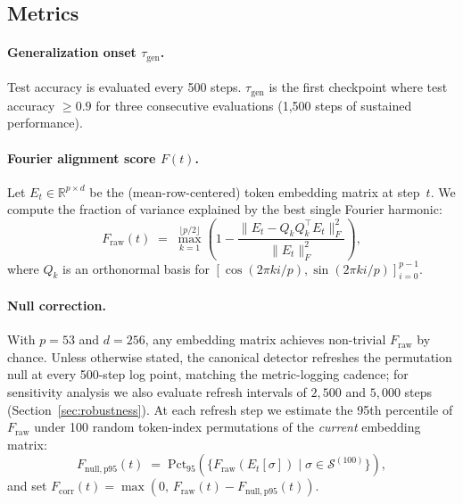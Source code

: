 \documentclass{article}
\newcommand{\taug}{\tau_{\mathrm{gen}}}
\newcommand{\fcorr}{F_{\mathrm{corr}}}
\begin{document}
\subsection{Metrics}

\paragraph{Generalization onset $\taug$.}
Test accuracy is evaluated every 500 steps.
$\taug$ is the first checkpoint where test accuracy $\geq 0.9$ for
three consecutive evaluations (1{,}500 steps of sustained
performance).

\paragraph{Fourier alignment score $F(t)$.}
Let $E_t \in \mathbb{R}^{p \times d}$ be the (mean-row-centered) token
embedding matrix at step~$t$.
We compute the fraction of variance explained by the best single
Fourier harmonic:
\begin{equation}
  F_{\mathrm{raw}}(t) \;=\; \max_{k=1}^{\lfloor p/2\rfloor}
  \!\left(1 - \frac{\|E_t - Q_k Q_k^\top E_t\|_F^2}
  {\|E_t\|_F^2}\right),
  \label{eq:f_raw}
\end{equation}
where $Q_k$ is an orthonormal basis for
$[\cos(2\pi ki/p),\sin(2\pi ki/p)]_{i=0}^{p-1}$.

\paragraph{Null correction.}
With $p=53$ and $d=256$, any embedding matrix achieves non-trivial
$F_{\mathrm{raw}}$ by chance.
Unless otherwise stated, the canonical detector refreshes the
permutation null at every 500-step log point, matching the
metric-logging cadence; for sensitivity analysis we also evaluate
refresh intervals of $2{,}500$ and $5{,}000$ steps
(Section~\ref{sec:robustness}).
At each refresh step we estimate the 95th percentile of
$F_{\mathrm{raw}}$ under 100 random token-index permutations of the
\emph{current} embedding matrix:
\begin{equation}
  F_{\mathrm{null,p95}}(t) \;=\;
  \mathrm{Pct}_{95}\!\left(
    \{F_{\mathrm{raw}}(E_t[\sigma]) \mid \sigma\in\mathcal{S}^{(100)}\}
  \right),
\end{equation}
and set $\fcorr(t)=\max(0,\,F_{\mathrm{raw}}(t)-F_{\mathrm{null,p95}}(t))$.
\end{document}
